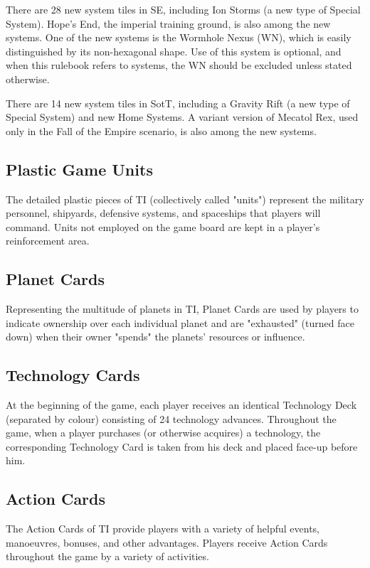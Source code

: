 \documentclass[11pt,fleqn]{book} %
\begin{document}
\begin{SEbox}There are 28 new system tiles in SE, including Ion Storms (a new type of Special System). Hope’s End, the imperial training ground, is also among the new systems. One of the new systems is the Wormhole Nexus (WN), which is easily distinguished by its non-hexagonal shape. Use of this system is optional, and when this rulebook refers to systems, the WN should be excluded unless stated otherwise.
\end{SEbox}

\begin{STbox}
There are 14 new system tiles in SotT, including a Gravity Rift (a new type of Special System) and new Home Systems. A variant version of Mecatol Rex, used only in the Fall of the Empire scenario, is also among the new systems.
\end{STbox}
\subsection{Plastic Game Units}
The detailed plastic pieces of TI (collectively called "units") represent the military personnel, shipyards, defensive systems, and spaceships that players will command. Units not employed on the game board are kept in a player’s reinforcement area.

\subsection{Planet Cards}
Representing the multitude of planets in TI, Planet Cards are used by players to indicate ownership over each individual planet and are "exhausted" (turned face down) when their owner "spends" the planets' resources or influence.

\subsection{Technology Cards}
At the beginning of the game, each player receives an identical Technology Deck (separated by colour) consisting of 24   technology advances. Throughout the game, when a player purchases (or otherwise acquires) a technology, the corresponding Technology Card is taken from his deck and placed face-up before him. 
\subsection{ Action Cards}
The Action Cards of TI provide players with a variety of helpful events, manoeuvres, bonuses, and other advantages. Players receive Action Cards throughout the game by a variety of activities.
\end{document}
